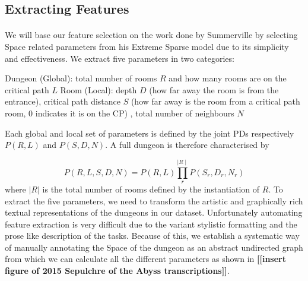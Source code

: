 \documentclass{UoYCSproject}
\begin{document}
\subsection{Extracting Features}
\label{subsec:feature_extraction}
\paragraph{}
We will base our feature selection on the work done by Summerville \parencite{SummervilleSamplingHyrule} by selecting Space related parameters from his Extreme Sparse model due to its simplicity and effectiveness. We extract five parameters in two categories: 
\begin{outline}[enumerate]
  \1 Dungeon (Global): total number of rooms \(R\) and how many rooms are on the critical path \(L\)
  \1 Room (Local): depth \(D\) (how far away the room is from the entrance), critical path distance \(S\) (how far away is the room from a critical path room, 0 indicates it is on the CP) , total number of neighbours \(N\)
\end{outline}
Each global and local set of parameters is defined by the joint PDs respectively \(P(R, L)\) and \(P(S, D, N)\). A full dungeon is therefore characterised by 

\begin{equation}
  \label{eq:full_joint_PD}
  P(R,L,S,D,N) = P(R, L) \prod_{r}^{\mid R \mid} P(S_r, D_r, N_r)
\end{equation}
where \(|R|\) is the total number of rooms defined by the instantiation of \(R\). To extract the five parameters, we need to transform the artistic and graphically rich textual representations of the dungeons in our dataset. Unfortunately automating feature extraction is very difficult due to the variant stylistic formatting and the prose like description of the tasks. Because of this, we establish a systematic way of manually annotating the Space of the dungeon as an abstract undirected graph from which we can calculate all the different parameters as shown in \textbf{[[insert figure of 2015 Sepulchre of the Abyss transcriptions]]}.
\end{document}
